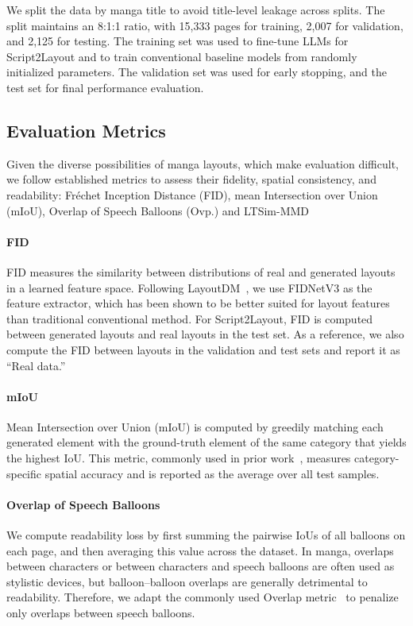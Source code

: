 We split the data by manga title to avoid title-level leakage across splits. The split maintains an 8:1:1 ratio, with 15,333 pages for training, 2,007 for validation, and 2,125 for testing. The training set was used to fine-tune LLMs for Script2Layout and to train conventional baseline models from randomly initialized parameters. The validation set was used for early stopping, and the test set for final performance evaluation.

\subsection{Evaluation Metrics}
\vspace{-0.5em}
Given the diverse possibilities of manga layouts, which make evaluation difficult, 
we follow established metrics to assess their fidelity, spatial consistency, and readability: 
Fréchet Inception Distance (FID), mean Intersection over Union (mIoU),  Overlap of Speech Balloons (Ovp.) and LTSim-MMD~\cite{otani2024ltsim}

\vspace{-0.5em}
\paragraph{FID}
FID measures the similarity between distributions of real and generated layouts in a learned feature space. 
Following LayoutDM~\cite{inoue2023layoutdm}, we use FIDNetV3 as the feature extractor, which has been shown to be better suited for layout features than traditional conventional method. 
For Script2Layout, FID is computed between generated layouts and real layouts in the test set. 
As a reference, we also compute the FID between layouts in the validation and test sets and report it as ``Real data.''

\vspace{-0.5em}
\paragraph{mIoU}
Mean Intersection over Union (mIoU) is computed by greedily matching each generated element with the ground-truth element of the same category that yields the highest IoU. 
This metric, commonly used in prior work~\cite{meanIoU}, measures category-specific spatial accuracy and is reported as the average over all test samples.

\vspace{-0.5em}
\paragraph{Overlap of Speech Balloons}
We compute readability loss by first summing the pairwise IoUs of all balloons on each page, and then averaging this value across the dataset. In manga, overlaps between characters or between characters and speech balloons are often used as stylistic devices, but balloon–balloon overlaps are generally detrimental to readability. Therefore, we adapt the commonly used Overlap metric~\cite{li_layoutgan_2019} to penalize only overlaps between speech balloons.

